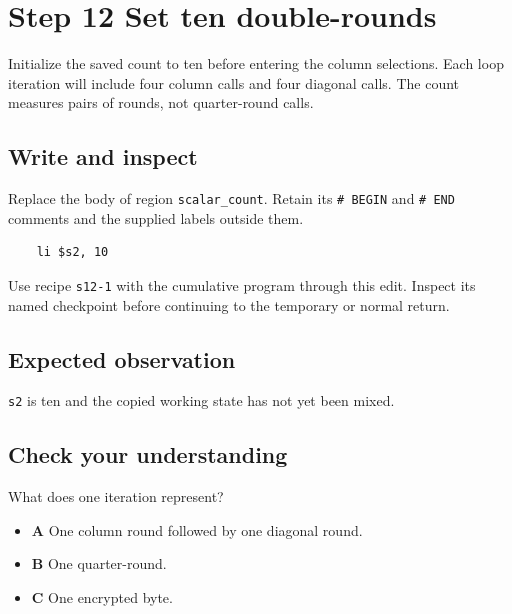 \section{Step 12 Set ten double-rounds}\label{chacha-s12}

Initialize the saved count to ten before entering the column selections. Each loop iteration will include four column calls and four diagonal calls. The count measures pairs of rounds, not quarter-round calls.

\subsection{Write and inspect}
Replace the body of region \texttt{scalar\_count}. Retain its \texttt{\# BEGIN} and \texttt{\# END} comments and the supplied labels outside them.

\begin{verbatim}
    li $s2, 10
\end{verbatim}

Use recipe \texttt{s12-1} with the cumulative program through this edit. Inspect its named checkpoint before continuing to the temporary or normal return.

\subsection{Expected observation}
\texttt{s2} is ten and the copied working state has not yet been mixed.

\subsection{Check your understanding}
What does one iteration represent?

\begin{itemize}
  \item \textbf{A} One column round followed by one diagonal round.
  \item \textbf{B} One quarter-round.
  \item \textbf{C} One encrypted byte.
\end{itemize}
